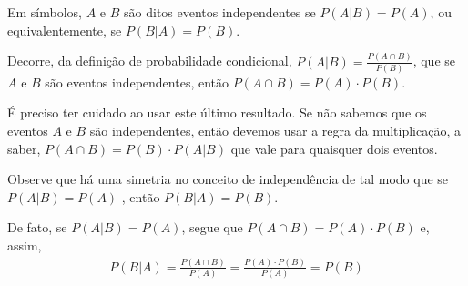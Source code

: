 Em símbolos, \(A\) e \(B\)  são ditos eventos independentes se \(P(A|B)=P(A)\), ou equivalentemente, se \(P(B|A)=P(B)\).

Decorre, da definição de probabilidade condicional,
\(P(A|B)=\frac{P(A\cap B)}{P(B)}\), que se \(A\) e \(B\)
são eventos independentes, então \(P(A\cap B)=P(A) \cdot P(B)\).

É preciso ter cuidado ao usar este último resultado. Se não sabemos que os eventos \(A\) e \(B\) são independentes, então devemos usar a regra da multiplicação, a saber, \(P(A\cap B)=P(B)\cdot P(A|B)\) que vale para quaisquer dois eventos.

Observe que há uma simetria no conceito de independência de tal modo que se
\(P(A|B)=P(A)\) , então \(P(B|A)=P(B)\).

De fato, se \(P(A|B)=P(A)\), segue que \(P(A\cap B)=P(A) \cdot P(B)\) e, assim,
\begin{equation*}
\begin{split}P(B|A)=\frac{P(A\cap B)}{P(A)}=\frac{P(A)\cdot P(B)}{P(A)}=P(B)\end{split}
\end{equation*}
